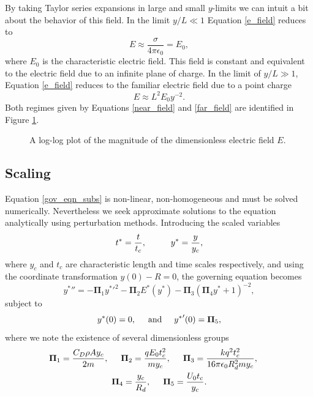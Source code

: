 \documentclass[aip,reprint, floatfix]{revtex4-1}
\begin{document}
By taking Taylor series expansions in large and small $y$-limits we can intuit a bit about the behavior of this field. In the limit $y/L \ll 1$ Equation \ref{e_field} reduces to
\begin{equation}
\label{near_field}
E \approx \frac{\sigma}{4 \pi \epsilon_0} = E_0,
\end{equation}
where $E_0$ is the characteristic electric field. This field is constant and equivalent to the electric field due to an infinite plane of charge. In the limit of $y/L \gg 1$, Equation \ref{e_field} reduces to the familiar electric field due to a point charge
\begin{equation}
\label{far_field}
E \approx L^2 E_0 y^{-2}.
\end{equation}
Both regimes given by Equations \ref{near_field} and \ref{far_field} are identified in Figure \ref{fig:E0}.
\begin{figure}[h]
    \centering
    \def\svgwidth{\columnwidth}
    
    \caption{A log-log plot of the magnitude of the dimensionless electric field $E$.\label{fig:E0}}
\end{figure}

\subsection{Scaling}
Equation \ref{gov_eqn_subs} is non-linear, non-homogeneous and must be solved numerically. Nevertheless we seek approximate solutions to the equation analytically using perturbation methods. Introducing the scaled variables
\begin{equation}
 t^* = \frac{t}{t_c}, \hspace{10 mm} y^* = \frac{y}{y_c}, \end{equation}
where $y_c$ and $t_c$ are characteristic length and time scales respectively, and using the coordinate transformation $y(0) - R = 0$, the governing equation becomes
\begin{equation}
\label{pi_terms}
 {y^*}'' = - \mathbf{\Pi}_1 {y^*}'^2
- \mathbf{\Pi}_2 E^* ( {y^*} ) 
- \mathbf{\Pi}_3 \left( \mathbf{\Pi}_4 {y^*} + 1 \right)^{-2},
\end{equation}
subject to
\begin{equation*}
{y^*}(0) = 0, \hspace{5 mm} \mbox{and} \hspace{5 mm} {y^*}'(0) = \mathbf{\Pi}_5,
\end{equation*}
where we note the existence of several dimensionless groups
\begin{gather*}
\mathbf{\Pi}_1 = \frac{C_D \rho A y_c}{2 m}, \hspace{5 mm}
\mathbf{\Pi}_2 = \frac{q E_0 t_c^2}{m y_c}, \hspace{5 mm}
\mathbf{\Pi}_3 = \frac{k q^2 t_c^2}{16 \pi \epsilon_0 R_d^2 m y_c}, \hspace{5 mm}\\
\mathbf{\Pi}_4 = \frac{y_c}{R_d}, \hspace{5 mm}
\mathbf{\Pi}_5 = \frac{U_0 t_c}{y_c}.
\end{gather*}
\end{document}
